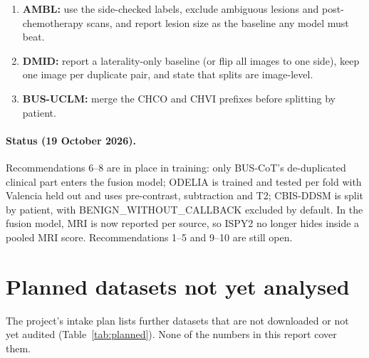 \documentclass[11pt]{article}
\begin{document}
\begin{enumerate}
  BUS-BRA (or any annotated source), otherwise the translated images inherit
  calipers and text placed on the lesion.
  \item \textbf{AMBL:} use the side-checked labels, exclude ambiguous lesions
  and post-chemotherapy scans, and report lesion size as the baseline any
  model must beat.
  \item \textbf{DMID:} report a laterality-only baseline (or flip all images to
  one side), keep one image per duplicate pair, and state that splits are
  image-level.
  \item \textbf{BUS-UCLM:} merge the CHCO and CHVI prefixes before splitting by
  patient.
\end{enumerate}

\paragraph{Status (19 October 2026).} Recommendations 6--8 are in place in
training: only BUS-CoT's de-duplicated clinical part enters the fusion
model; ODELIA is trained and tested per fold with Valencia held out and
uses pre-contrast, subtraction and T2; CBIS-DDSM is split by patient, with
BENIGN\_WITHOUT\_CALLBACK excluded by default. In the fusion model, MRI is
now reported per source, so ISPY2 no longer hides inside a pooled MRI
score. Recommendations 1--5 and 9--10 are still open.

\section{Planned datasets not yet analysed}
\label{sec:planned}

The project's intake plan lists further datasets that are not downloaded or
not yet audited (Table~\ref{tab:planned}). None of the numbers in this report
cover them.
\end{document}
